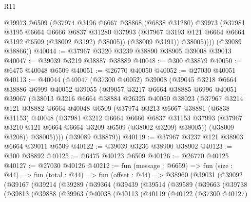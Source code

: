 \begin{lexlean}{R11}
\begin{coremodule}
              @39973
              @6509
              (@37974
                @3196
                @6667
                @38868
                (@6838 @31280)
                @39973
                (@37981
                  @3195
                  @6664
                  @6666
                  @6837
                  @31280
                  @37993
                  (@37967 @3193 @121 @6664 @6664 @3192 @6509 (@38002 @3192) @38005))
                (@38009 @3191))
              @38005))))
      (@39089 @38866))
@40044 := @37967 @3220 @3239 @38890 @38905 @39008 @39013
@40047 := @39039 @3219 @38887 @38889
@40048 := @300 @38879
@40050 := @6475 @40048 @6509
@40051 := @26770 @40050
@40052 := @27030 @40051
@40113 := @40044
    (@40047
      (@37300 @40052)
      @39008
      (@39045
        @3218
        @6664
        @38886
        @6999
        @40052
        @39055
        (@39057
          @3217
          @6664
          @38885
          @6996
          @40051
          @39067
          (@38013
            @3216
            @6664
            @38884
            @26325
            @40050
            @38023
            (@37967
              @3214
              @121
              @38882
              @6664
              @40048
              @6509
              (@37974
                @3213
                @6667
                @38881
                (@6838 @31153)
                @40048
                (@37981
                  @3212
                  @6664
                  @6666
                  @6837
                  @31153
                  @37993
                  (@37967 @3210 @121 @6664 @6664 @3209 @6509 (@38002 @3209) @38005))
                (@38009 @3208))
              @38005))))
      (@39089 @38879))
@40119 := @37967 @3237 @121 @38903 @6664 @39011 @6509
@40122 := @39039 @3236 @38900 @38902
@40123 := @300 @38892
@40125 := @6475 @40123 @6509
@40126 := @26770 @40125
@40127 := @27030 @40126
@40212 := fun (message : @6659) =>
  fun (size : @44) =>
  fun (total : @44) =>
  fun (offset : @44) =>
  @38960
    (@39031
      (@39092
        (@39167
          (@39214
            (@39289
              (@39364
                (@39439
                  (@39514
                    (@39589
                      (@39663
                        (@39738
                          (@39813
                            (@39888
                              (@39963
                                (@40038
                                  (@40113
                                    (@40119
                                      (@40122
                                        (@37300 @40127)

\end{coremodule}
\end{lexlean}
